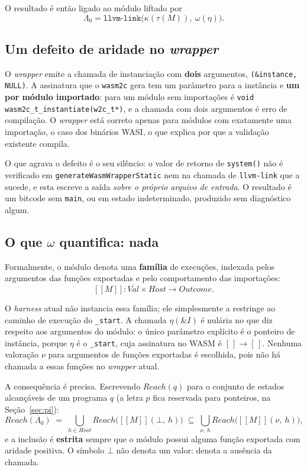 \documentclass[11pt,a4paper]{article}
\theoremstyle{definition}
\newcommand{\sem}[1]{[\![#1]\!]}          %
\newcommand{\Reach}{\mathit{Reach}}
\newcommand{\code}[1]{\texttt{#1}}
\begin{document}
O resultado é então ligado ao
módulo liftado por
\[
  \Lambda_0 = \code{llvm-link}\bigl(\kappa(\tau(M)),\ \omega(\eta)\bigr).
\]

\subsection{Um defeito de aridade no \emph{wrapper}}
\label{sec:aridade}

O \emph{wrapper} emite a chamada de instanciação com \textbf{dois} argumentos,
\code{(\&instance, NULL)}. A assinatura que o \code{wasm2c} gera tem um parâmetro
para a instância e \textbf{um por módulo importado}: para um módulo sem
importações é \code{void wasm2c\_t\_instantiate(w2c\_t*)}, e a chamada com dois
argumentos é erro de compilação. O \emph{wrapper} está correto apenas para
módulos com exatamente uma importação, o caso dos binários WASI, o que explica
por que a validação existente compila.

O que agrava o defeito é o seu silêncio: o valor de retorno de \code{system()}
não é verificado em \code{generateWasmWrapperStatic} nem na chamada de
\code{llvm-link} que a sucede, e esta escreve a saída \emph{sobre o próprio
arquivo de entrada}. O resultado é um bitcode sem \code{main}, ou em estado
indeterminado, produzido sem diagnóstico algum.

\subsection{O que $\omega$ quantifica: nada}
\label{sec:harness}

Formalmente, o módulo denota uma \textbf{família} de execuções, indexada pelos
argumentos das funções exportadas e pelo comportamento das importações:
\[
  \sem{M} : \overline{\mathit{Val}} \times \mathit{Host} \longrightarrow
            \mathit{Outcome}.
\]

O \emph{harness} atual não instancia essa família; ele simplesmente
a restringe ao caminho de execução do \code{\_start}. A chamada $\eta(\&I)$ é
nulária no que diz respeito aos argumentos do módulo: o único parâmetro
explícito é o ponteiro de instância, porque $\eta$ é o \code{\_start}, cuja
assinatura no WASM é $[\,] \rightarrow [\,]$. Nenhuma valoração $\nu$ para
argumentos de funções exportadas é escolhida, pois não há chamada a essas
funções no \emph{wrapper} atual.

A consequência é precisa. Escrevendo $\Reach(q)$ para o conjunto de estados
alcançáveis de um programa $q$ (a letra $p$ fica reservada para ponteiros, na
Seção~\ref{sec:pi}):
\[
  \Reach(\Lambda_0)
  \;=\; \bigcup_{h \in \mathit{Host}} \Reach\bigl(\sem{M}(\bot,\ h)\bigr)
  \;\subseteq\; \bigcup_{\nu,\ h} \Reach\bigl(\sem{M}(\nu,\ h)\bigr),
\]
e a inclusão é \textbf{estrita} sempre que o módulo possui alguma função exportada
com aridade positiva. O símbolo $\bot$ não denota um valor: denota a ausência da
chamada.
\end{document}
